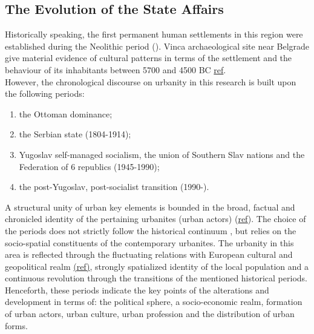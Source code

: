 \documentclass[11pt]{report}
\begin{document}
\subsection{The Evolution of the State Affairs}

Historically speaking, the first permanent human settlements in this region were established during the  Neolithic  period (\href{Krstic}{\citealt{krstic_planerski_1972}}). Vinca archaeological site near Belgrade give material evidence of cultural patterns in terms of the settlement and the behaviour of its inhabitants between 5700 and 4500 BC \href{}{ref}.
\\

However, the chronological discourse on urbanity in this research is built upon the following periods:

\begin{enumerate}
\item the Ottoman dominance;
\item the Serbian state (1804-1914);\footnotemark 
\item Yugoslav self-managed socialism, the union of Southern Slav nations and the Federation of 6 republics (1945-1990);
\item the post-Yugoslav, post-socialist transition (1990-).
\end{enumerate}


A structural unity of urban key elements is bounded in the broad, factual and chronicled identity of the pertaining urbanites (urban actors) (\href{}{ref}).
The choice of the periods does not strictly follow the historical continuum \footnotemark, but relies on the socio-spatial constituents of the contemporary urbanites. The urbanity in this area is reflected through the fluctuating relations with European cultural and geopolitical realm \href{}{(ref)}, strongly spatialized identity of the local population \href{}{\citealt{savic_where_2014}} and a continuous revolution through the transitions of the mentioned historical periods. Henceforth, these periods indicate the key points of the alterations and development in terms of: the political sphere, a socio-economic realm, formation of urban actors, urban culture, urban profession and the distribution of urban forms.
\end{document}
